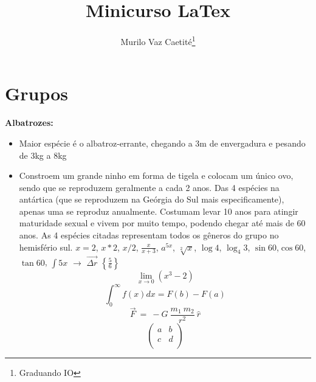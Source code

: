\documentclass[12pt,a4paper]{book}
\begin{document}
\title{Minicurso LaTex}
\author{Murilo Vaz Caetité\footnote{Graduando IO}}
\maketitle

\tableofcontents


\section{Grupos}
\textbf{Albatrozes:}

\begin{itemize}

\item Maior espécie é o albatroz-errante, chegando a 3m de envergadura e pesando de 3kg a 8kg
\item Constroem um grande ninho em forma de tigela e colocam um único ovo, sendo que se reproduzem geralmente a cada 2 anos. Das 4 espécies na antártica (que se reproduzem na Geórgia do Sul mais especificamente), apenas uma se reproduz anualmente. Costumam levar 10 anos para atingir maturidade sexual e vivem por muito tempo, podendo chegar até mais de 60 anos. As 4 espécies citadas representam todos os gêneros do grupo no hemisfério sul.  $x=2$, $x*2$, $x/2$, $\frac{x}{x+3}$, $a^{5x}$, $\sqrt[2]{x}$, $\log4$, $\log_{4}3$, $\sin 60$,$\cos 60$, $\tan 60$, $\int 5x$
$\rightarrow$ $\overrightarrow{\Delta r}$ $\left\lbrace\frac{5}{6}\right\rbrace$
\begin{equation}
\lim_{x\rightarrow 0} (x^{3}-2)
\end{equation}
\begin{equation}
\int_{0}^{\infty}f(x)dx=F(b)-F(a)
\end{equation}
\begin{equation}
\vec{F}\:=\:-G\:\frac{m_1\:m_2}{r^2}\:\hat{r}
\end{equation}
\begin{equation}
\left(\begin{array}{lr}
a&b\\
c&d\\
\end{array}
\right)
\end{equation}


\end{itemize}
\end{document}
